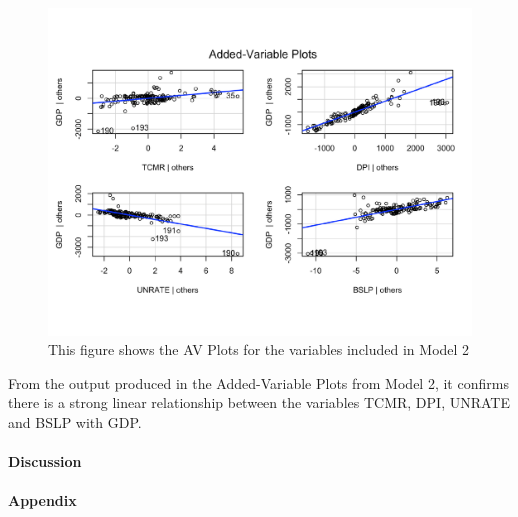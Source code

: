 \documentclass[12pt]{article}
\begin{document}
\begin{figure}[H]
  \centering
  \includegraphics[scale = .5]{AVP2}
  \caption{This figure shows the AV Plots for the variables included in Model 2}
\end{figure}

From the output produced in the Added-Variable Plots from Model 2, it confirms there is a strong linear relationship between the variables TCMR, DPI, UNRATE and BSLP with GDP. 








\paragraph{Discussion}


\paragraph{Appendix}




\end{document}

